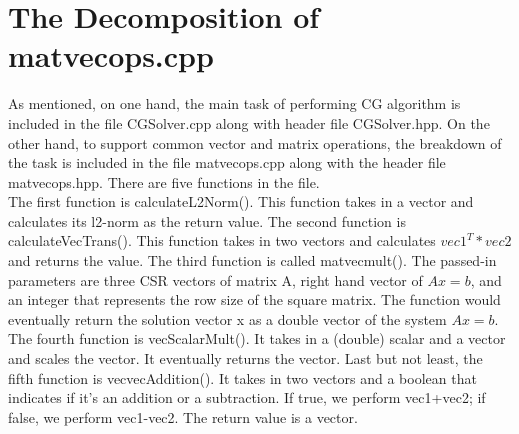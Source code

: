 \documentclass{article}
\begin{document}
\section{The Decomposition of {\selectfont matvecops.cpp}}

As mentioned, on one hand, the main task of performing CG algorithm is included in the file {\selectfont CGSolver.cpp} along with header file {\selectfont CGSolver.hpp}. On the other hand, to support common vector and matrix operations, the breakdown of the task is included in the file {\selectfont matvecops.cpp} along with the header file {\selectfont matvecops.hpp}. There are five functions in the file. \\
The first function is {\selectfont calculateL2Norm()}. This function takes in a vector and calculates its l2-norm as the return value. The second function is {\selectfont calculateVecTrans()}. This function takes in two vectors and calculates $vec1^T * vec2$ and returns the value. The third function is called {\selectfont matvecmult()}. The passed-in parameters are three CSR vectors of matrix A, right hand vector of $Ax = b$, and an integer that represents the row size of the square matrix. The function would eventually return the solution vector x as a double vector of the system $Ax = b$. 
The fourth function is {\selectfont vecScalarMult()}. It takes in a (double) scalar and a vector and scales the vector. It eventually returns the vector. Last but not least, the fifth function is {\selectfont vecvecAddition()}. It takes in two vectors and a boolean that indicates if it's an addition or a subtraction. If true, we perform vec1+vec2; if false, we perform vec1-vec2. The return value is a vector. 
\end{document}
